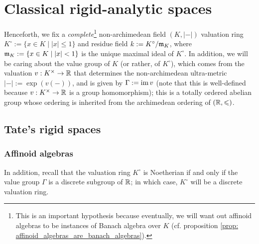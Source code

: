 \section{Classical rigid-analytic spaces}
    \begin{convention} \label{conv: rigid_analytic_varieties_non_archimedean_ground_field}
        Henceforth, we fix a \textit{complete}\footnote{This is an important hypothesis because eventually, we will want out affinoid algebras to be instances of Banach algebra over $K$ (cf. proposition \ref{prop: affinoid_algebras_are_banach_algebras}).} non-archimedean field $(K, |-|)$ valuation ring $K^{\circ} := \{x \in K \mid |x| \leq 1\}$ and residue field $k := K^{\circ}/\mathfrak{m}_K$, where $\mathfrak{m}_K := \{x \in K \mid |x| < 1\}$ is the unique maximal ideal of $K^{\circ}$. In addition, we will be caring about the value group of $K$ (or rather, of $K^{\circ}$), which comes from the valuation $v: K^{\x} \to \R$ that determines the non-archimedean ultra-metric $|-| := \exp(v(-))$, and is given by $\Gamma := \operatorname{im} v$ (note that this is well-defined because $v: K^{\x} \to \R$ is a group homomorphism); this is a totally ordered abelian group whose ordering is inherited from the archimedean ordering of $(\mathbb{R}, \leqslant)$.
    \end{convention}

    \subsection{Tate's rigid spaces}
        \subsubsection{Affinoid algebras}
            \begin{remark}
                In addition, recall that the valuation ring $K^{\circ}$ is Noetherian if and only if the value group $\Gamma$ is a discrete subgroup of $\mathbb{R}$; in which case, $K^{\circ}$ will be a discrete valuation ring.
            \end{remark}
            
